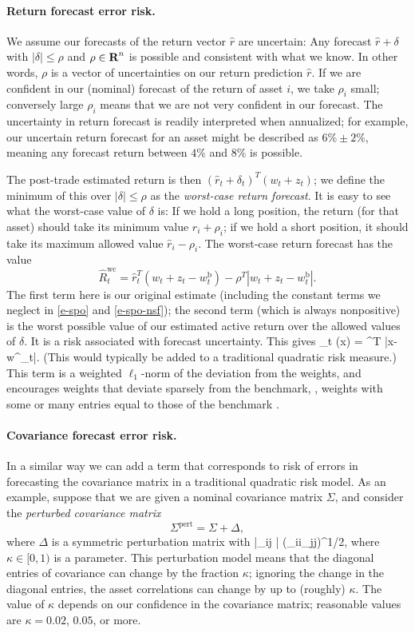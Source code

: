 \documentclass[openany]{now}
\newcommand{\wb}{w^\mathrm{b}}
\begin{document}
\paragraph{Return forecast error risk.}
We assume our forecasts of the return vector $\hat r$
are uncertain: Any forecast $\hat r + \delta$ with $|\delta| \leq \rho$
and $\rho \in {\mbox{\bf R}}^n$ is possible and consistent with what we know.
In other words,
$\rho$ is a vector of uncertainties on our return prediction $\hat r$.
If we are confident in our (nominal) forecast of the return of asset $i$, we take
$\rho_i$ small; conversely large $\rho_i$ means that we are not
very confident in our forecast.
The uncertainty in return forecast is readily interpreted when
annualized; for example, our uncertain return forecast for an asset might be
described as $6\% \pm 2\%$, meaning any forecast return between
$4\%$ and $8\%$ is possible.

The post-trade estimated return is then
$(\hat r_t + \delta_t)^T (w_t+z_t)$;
we define the minimum of this over $|\delta| \leq \rho$ as the
\emph{worst-case return forecast}.  It is easy to see
what the worst-case value of $\delta$ is: If we hold a long position,
the return (for that asset) should take its minimum value $\hat r_i + \rho_i$;
if we hold a short position, it should take its
maximum allowed value $\hat r_i - \rho_i$.
The worst-case return forecast has the value
\[
\hat R^\mathrm{wc}_t = \hat r_t^T(w_t + z_t-\wb_t) - \rho^T |w_t + z_t-\wb_t|.
\]
The first term here is our original estimate
(including the constant terms we neglect in \eqref{e-spo} and \eqref{e-spo-nsf});
the second term (which is always
nonpositive) is the worst possible value of our estimated active return over
the allowed values of $\delta$.  It is a risk associated with forecast
uncertainty.
This gives
\BEQ\label{e-return-forecast-risk}
\psi_t (x) = \rho^T |x-\wb_t|.
\EEQ
(This would typically be added to a traditional quadratic risk measure.)
This term is a weighted $\ell_1$-norm of the deviation from the weights,
and encourages weights that deviate sparsely from the benchmark,
\ie, weights with some or many entries equal to those of the
benchmark \cite{fastrich2015constructing,ho2015weighted,li2015sparse}.

\paragraph{Covariance forecast error risk.}
In a similar way we can add a term that corresponds to risk of errors in forecasting
the covariance matrix in a traditional quadratic risk model.
As an example, suppose that we are given a nominal covariance matrix $\Sigma$,
and consider the \emph{perturbed covariance matrix}
\[
\Sigma^\mathrm{pert} = \Sigma + \Delta,
\]
where $\Delta$ is a symmetric perturbation matrix with
\BEQ\label{e-pert-limit}
|\Delta_{ij} | \leq \kappa \left(\Sigma_{ii}\Sigma_{jj}\right)^{1/2},
\EEQ
where $\kappa \in [0,1)$ is a parameter.
This perturbation model means that the diagonal entries of covariance can
change by the fraction $\kappa$; ignoring the change in the diagonal entries,
the asset correlations can change by up to (roughly) $\kappa$.  The value of
$\kappa$ depends on our confidence in the covariance matrix; reasonable values
are $\kappa = 0.02$, $0.05$, or more.
\end{document}
